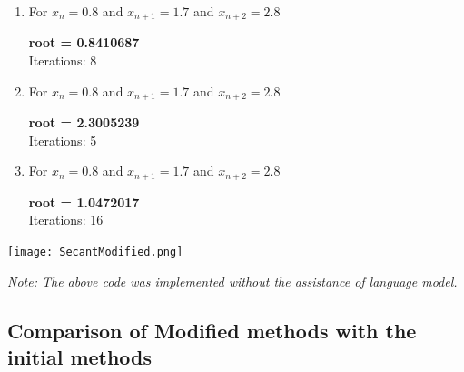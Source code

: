 \documentclass{article}
\begin{document}
\begin{tcolorbox}[colback=blue!10, colframe=gray!80, width=\textwidth, sharp corners]
\begin{enumerate}
\item For $x_{n}=0.8 $ and $x_{n+1}= 1.7$ and $x_{n+2}= 2.8 $ 
\begin{center}
   \textbf{ root = 0.8410687} \\
    Iterations: 8
\end{center}
\item For $x_{n}=0.8 $ and $x_{n+1}= 1.7$ and $x_{n+2}= 2.8 $ 
\begin{center}
    \textbf{root = 2.3005239} \\
    Iterations: 5
\end{center}
\item For $x_{n}=0.8 $ and $x_{n+1}= 1.7$ and $x_{n+2}= 2.8 $ 
\begin{center}
    \textbf{root = 1.0472017} \\
    Iterations: 16
\end{center}

\end{enumerate}
\end{tcolorbox}

\begin{tcolorbox}[colback=gray!10, colframe=gray!80, width=\textwidth, sharp corners]
    \centering 
    \texttt{[image: SecantModified.png]} 


    \vspace{0.5cm} 
    
    
    \small\textit{Note: The above code was implemented without the assistance of language model.}
\end{tcolorbox}

\subsection{Comparison of Modified methods with the initial methods}
\end{document}
